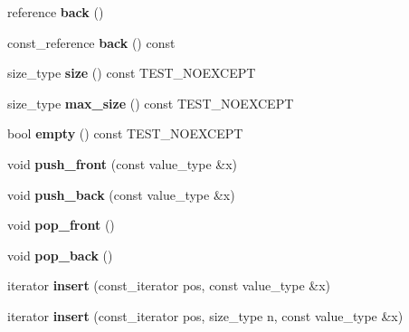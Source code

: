 \begin{DoxyCompactItemize}
\mbox{\label{classnasty__list_a4deac9c157e2a53cd84bef7269436a83}} 
reference {\bfseries back} ()
\item 
\mbox{\label{classnasty__list_adbea9d3787e89c8f272140f5d6b1ebbe}} 
const\+\_\+reference {\bfseries back} () const
\item 
\mbox{\label{classnasty__list_abaac063c39486a4f0d43e6394644301a}} 
size\+\_\+type {\bfseries size} () const T\+E\+S\+T\+\_\+\+N\+O\+E\+X\+C\+E\+PT
\item 
\mbox{\label{classnasty__list_a3c62cb818d7bc2b2b55c58c6bb076715}} 
size\+\_\+type {\bfseries max\+\_\+size} () const T\+E\+S\+T\+\_\+\+N\+O\+E\+X\+C\+E\+PT
\item 
\mbox{\label{classnasty__list_a918879ee62affd74cbb53786c6f1a3e2}} 
bool {\bfseries empty} () const T\+E\+S\+T\+\_\+\+N\+O\+E\+X\+C\+E\+PT
\item 
\mbox{\label{classnasty__list_a18104bb48d55d5bf510746ed4bf974f7}} 
void {\bfseries push\+\_\+front} (const value\+\_\+type \&x)
\item 
\mbox{\label{classnasty__list_a8602bf8fffad51bfc3a6931280c4e5af}} 
void {\bfseries push\+\_\+back} (const value\+\_\+type \&x)
\item 
\mbox{\label{classnasty__list_a88098c755533e3eedbcf933612fce233}} 
void {\bfseries pop\+\_\+front} ()
\item 
\mbox{\label{classnasty__list_ad7df1fda0145e863b8d5ec302b43e4f7}} 
void {\bfseries pop\+\_\+back} ()
\item 
\mbox{\label{classnasty__list_abeff629ebb3a8ab581472899e8a239ac}} 
iterator {\bfseries insert} (const\+\_\+iterator pos, const value\+\_\+type \&x)
\item 
\mbox{\label{classnasty__list_a7e75537c193c824400306c87966430c2}} 
iterator {\bfseries insert} (const\+\_\+iterator pos, size\+\_\+type n, const value\+\_\+type \&x)
\item 

\end{DoxyCompactItemize}
